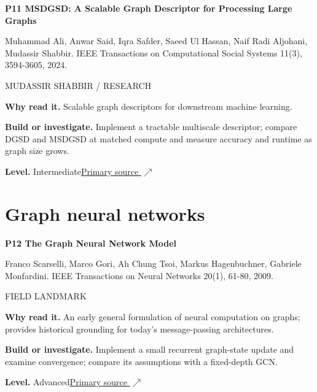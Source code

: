 \documentclass[11pt,letterpaper]{article}
\begin{document}
\begin{minipage}{\linewidth}
{\large\bfseries P11 MSDGSD: A Scalable Graph Descriptor for Processing Large Graphs}\par
Muhammad Ali, Anwar Said, Iqra Safder, Saeed Ul Hassan, Naif Radi Aljohani, Mudassir Shabbir. IEEE Transactions on Computational Social Systems 11(3), 3594-3605, 2024.\par
\textcolor{ink}{\small MUDASSIR SHABBIR / RESEARCH}\par
\textbf{Why read it.} Scalable graph descriptors for downstream machine learning.\par
\textbf{Build or investigate.} Implement a tractable multiscale descriptor; compare DGSD and MSDGSD at matched compute and measure accuracy and runtime as graph size grows.\par
\textbf{Level.} Intermediate\quad\href{https://doi.org/10.1109/TCSS.2023.3338691}{Primary source $\nearrow$}\par
\end{minipage}\par\vspace{10pt}
\section*{Graph neural networks}
\begin{minipage}{\linewidth}
{\large\bfseries P12 The Graph Neural Network Model}\par
Franco Scarselli, Marco Gori, Ah Chung Tsoi, Markus Hagenbuchner, Gabriele Monfardini. IEEE Transactions on Neural Networks 20(1), 61-80, 2009.\par
\textcolor{ink}{\small FIELD LANDMARK}\par
\textbf{Why read it.} An early general formulation of neural computation on graphs; provides historical grounding for today's message-passing architectures.\par
\textbf{Build or investigate.} Implement a small recurrent graph-state update and examine convergence; compare its assumptions with a fixed-depth GCN.\par
\textbf{Level.} Advanced\quad\href{https://doi.org/10.1109/TNN.2008.2005605}{Primary source $\nearrow$}\par
\end{minipage}\par\vspace{10pt}
\end{document}
